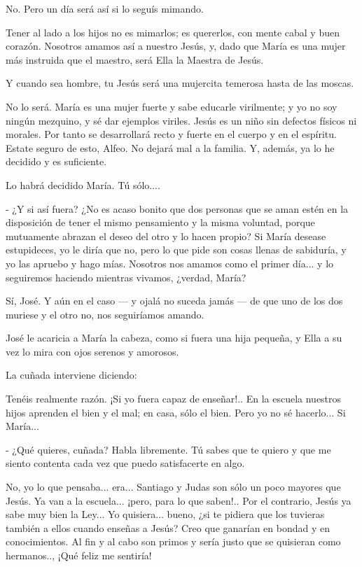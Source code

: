 \documentclass[12pt, twoside, openright]{book} %
\begin{document}
No. Pero un día será así si lo seguís mimando. 

Tener al lado a los hijos no es mimarlos; es quererlos, con mente cabal y buen corazón. Nosotros amamos así a nuestro Jesús, y, dado que María es una mujer más instruida que el maestro, será Ella la Maestra de Jesús. 

Y cuando sea hombre, tu Jesús será una mujercita temerosa hasta de las moscas. 

No lo será. María es una mujer fuerte y sabe educarle virilmente; y yo no soy ningún mezquino, y sé dar ejemplos viriles. Jesús es un niño sin defectos físicos ni morales. Por tanto se desarrollará recto y fuerte en el cuerpo y en el espíritu. Estate seguro de esto, Alfeo. No dejará mal a la familia. Y, además, ya lo he decidido y es suficiente. 

Lo habrá decidido María. Tú sólo.... 

- ¿Y si así fuera? ¿No es acaso bonito que dos personas que se aman estén en la disposición de tener el mismo pensamiento y la misma voluntad, porque mutuamente abrazan el deseo del otro y lo hacen propio? Si María desease estupideces, yo le diría que no, pero lo que pide son cosas llenas de sabiduría, y yo las apruebo y hago mías. Nosotros nos amamos como el primer día... y lo seguiremos haciendo mientras vivamos, ¿verdad, María? 

Sí, José. Y aún en el caso — y ojalá no suceda jamás — de que uno de los dos muriese y el otro no, nos seguiríamos amando. 

José le acaricia a María la cabeza, como si fuera una hija pequeña, y Ella a su vez lo mira con ojos serenos y amorosos. 

La cuñada interviene diciendo: 

Tenéis realmente razón. ¡Si yo fuera capaz de enseñar!.. En la escuela nuestros hijos aprenden el bien y el mal; en casa, sólo el bien. Pero yo no sé hacerlo... Si María... 

- ¿Qué quieres, cuñada? Habla libremente. Tú sabes que te quiero y que me siento contenta cada vez que puedo satisfacerte en algo. 

No, yo lo que pensaba... era... Santiago y Judas son sólo un poco mayores que Jesús. Ya van a la escuela... ¡pero, para lo que saben!.. Por el contrario, Jesús ya sabe muy bien la Ley... Yo quisiera... bueno, ¿si te pidiera que los tuvieras también a ellos cuando enseñas a Jesús? Creo que ganarían en bondad y en conocimientos. Al fin y al cabo son primos y sería justo que se quisieran como hermanos.., ¡Qué feliz me sentiría! 
\end{document}
